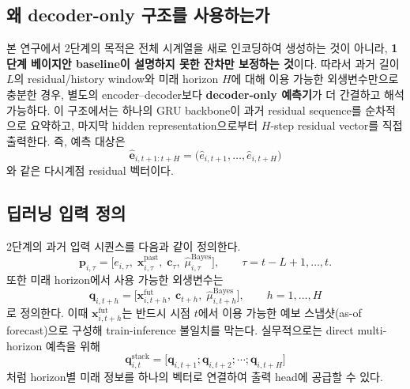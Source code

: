 \documentclass[11pt,a4paper]{article}
\begin{document}
\subsection{왜 decoder-only 구조를 사용하는가}
본 연구에서 2단계의 목적은 전체 시계열을 새로 인코딩하여 생성하는 것이 아니라, \textbf{1단계 베이지안 baseline이 설명하지 못한 잔차만 보정하는 것}이다. 따라서 과거 길이 $L$의 residual/history window와 미래 horizon $H$에 대해 이용 가능한 외생변수만으로 충분한 경우, 별도의 encoder--decoder보다 \textbf{decoder-only 예측기}가 더 간결하고 해석 가능하다. 이 구조에서는 하나의 GRU backbone이 과거 residual sequence를 순차적으로 요약하고, 마지막 hidden representation으로부터 $H$-step residual vector를 직접 출력한다. 즉, 예측 대상은
\begin{equation}
    \hat{\bm e}_{i,t+1:t+H} =
    \big(
    \hat e_{i,t+1},\dots,\hat e_{i,t+H}
    \big)
\end{equation}
와 같은 다시계점 residual 벡터이다.

\subsection{딥러닝 입력 정의}
2단계의 과거 입력 시퀀스를 다음과 같이 정의한다.
\begin{equation}
    \bm p_{i,\tau} = \Big[
    e_{i,\tau},\;
    \bm x^{\mathrm{past}}_{i,\tau},\;
    \bm c_{\tau},\;
    \hat \mu^{\mathrm{Bayes}}_{i,\tau}
    \Big],
    \qquad \tau=t-L+1,\dots,t.
\end{equation}
또한 미래 horizon에서 사용 가능한 외생변수는
\begin{equation}
    \bm q_{i,t+h} = \Big[
    \bm x^{\mathrm{fut}}_{i,t+h},\;
    \bm c_{t+h},\;
    \hat \mu^{\mathrm{Bayes}}_{i,t+h}
    \Big],
    \qquad h=1,\dots,H
\end{equation}
로 정의한다. 이때 $\bm x^{\mathrm{fut}}_{i,t+h}$는 반드시 시점 $t$에서 이용 가능한 예보 스냅샷(as-of forecast)으로 구성해 train-inference 불일치를 막는다. 실무적으로는 direct multi-horizon 예측을 위해
\begin{equation}
    \bm q^{\mathrm{stack}}_{i,t} =
    \big[
    \bm q_{i,t+1};\bm q_{i,t+2};\cdots;\bm q_{i,t+H}
    \big]
\end{equation}
처럼 horizon별 미래 정보를 하나의 벡터로 연결하여 출력 head에 공급할 수 있다.
\end{document}
